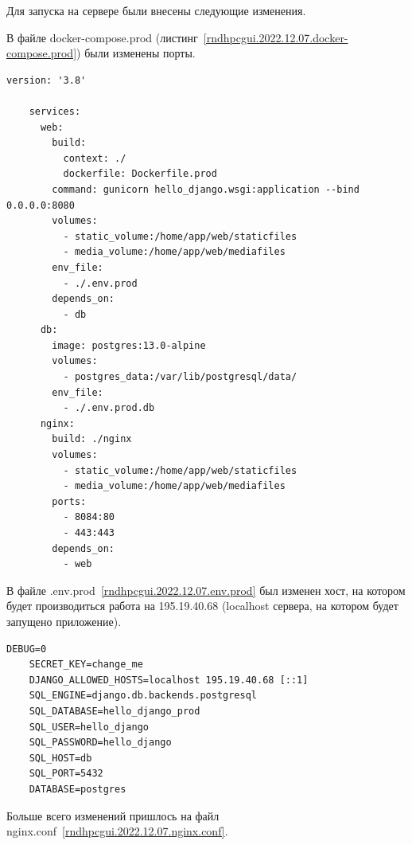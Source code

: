 \def\notedate{2022.12.07}
\def\currentauthor{Василян А.Р. (РК6-73Б)}


Для запуска на сервере были внесены следующие изменения.

	В файле \textsf{docker-compose.prod} (листинг~\ref{rndhpcgui.2022.12.07.docker-compose.prod}) были изменены порты.

\begin{lstlisting}[frame=single, label={rndhpcgui.2022.12.07.docker-compose.prod}, caption={Содержимое файла \textsf{docker-compose.prod.yml}}, language={docker-compose}] 
	version: '3.8'
	
	services:
	  web:
	    build:
	      context: ./
	      dockerfile: Dockerfile.prod
	    command: gunicorn hello_django.wsgi:application --bind 0.0.0.0:8080
	    volumes:
	      - static_volume:/home/app/web/staticfiles
	      - media_volume:/home/app/web/mediafiles
	    env_file:
	      - ./.env.prod
	    depends_on:
	      - db
	  db:
	    image: postgres:13.0-alpine
	    volumes:
	      - postgres_data:/var/lib/postgresql/data/
	    env_file:
	      - ./.env.prod.db
	  nginx:
	    build: ./nginx
	    volumes:
	      - static_volume:/home/app/web/staticfiles
	      - media_volume:/home/app/web/mediafiles
	    ports:
	      - 8084:80
	      - 443:443
	    depends_on:
	      - web
\end{lstlisting}

В файле \textsf{.env.prod}~\ref{rndhpcgui.2022.12.07.env.prod} был изменен хост, на котором будет производиться работа на 195.19.40.68 (localhost сервера, на котором будет запущено приложение).

\begin{lstlisting}[frame=single, label={rndhpcgui.2022.12.07.env.prod}, caption={Содержимое файла \textsf{.env.prod}}, language={aINIExample}] 
	DEBUG=0
	SECRET_KEY=change_me
	DJANGO_ALLOWED_HOSTS=localhost 195.19.40.68 [::1]
	SQL_ENGINE=django.db.backends.postgresql
	SQL_DATABASE=hello_django_prod
	SQL_USER=hello_django
	SQL_PASSWORD=hello_django
	SQL_HOST=db
	SQL_PORT=5432
	DATABASE=postgres
\end{lstlisting}

Больше всего изменений пришлось на файл \textsf{nginx.conf}~\ref{rndhpcgui.2022.12.07.nginx.conf}. 

